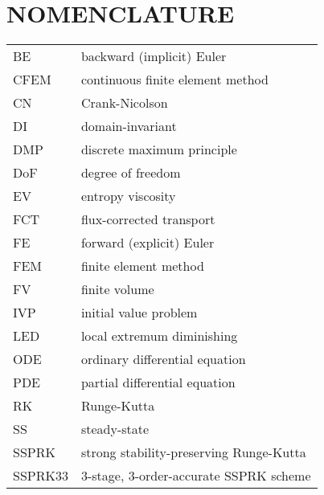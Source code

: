 \chapter*{NOMENCLATURE}

%
%

\begin{tabular}{l l}
BE    & backward (implicit) Euler\\
CFEM  & continuous finite element method\\
CN    & Crank-Nicolson\\
DI    & domain-invariant\\
DMP   & discrete maximum principle\\
DoF   & degree of freedom\\
EV    & entropy viscosity\\
FCT   & flux-corrected transport\\
FE    & forward (explicit) Euler\\
FEM   & finite element method\\
FV    & finite volume\\
IVP   & initial value problem\\
LED   & local extremum diminishing\\
ODE   & ordinary differential equation\\
PDE   & partial differential equation\\
RK    & Runge-Kutta\\
SS    & steady-state\\
SSPRK & strong stability-preserving Runge-Kutta\\
SSPRK33 & 3-stage, 3-order-accurate SSPRK scheme\\
\end{tabular}


